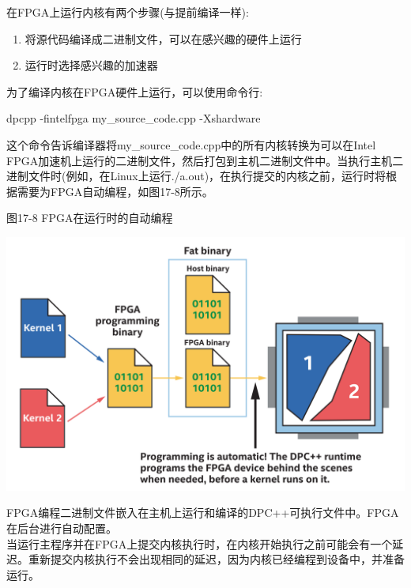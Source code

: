 在FPGA上运行内核有两个步骤(与提前编译一样):\par

\begin{enumerate}
	\item 将源代码编译成二进制文件，可以在感兴趣的硬件上运行
	\item 运行时选择感兴趣的加速器
\end{enumerate}

为了编译内核在FPGA硬件上运行，可以使用命令行:\par

\begin{tcolorbox}[colback=white,colframe=black]
dpcpp -fintelfpga my\_source\_code.cpp -Xshardware
\end{tcolorbox}

这个命令告诉编译器将my\_source\_code.cpp中的所有内核转换为可以在Intel FPGA加速机上运行的二进制文件，然后打包到主机二进制文件中。当执行主机二进制文件时(例如，在Linux上运行./a.out)，在执行提交的内核之前，运行时将根据需要为FPGA自动编程，如图17-8所示。\par

\hspace*{\fill} \par %
图17-8 FPGA在运行时的自动编程
\begin{center}
	\includegraphics[width=1.0\textwidth]{content/chapter-17/images/9}
\end{center}

\begin{tcolorbox}[colback=red!5!white,colframe=red!75!black]
FPGA编程二进制文件嵌入在主机上运行和编译的DPC++可执行文件中。FPGA在后台进行自动配置。\\

当运行主程序并在FPGA上提交内核执行时，在内核开始执行之前可能会有一个延迟。重新提交内核执行不会出现相同的延迟，因为内核已经编程到设备中，并准备运行。
\end{tcolorbox}

